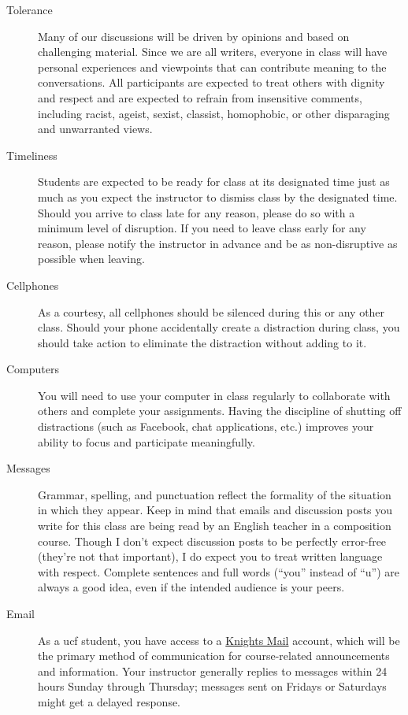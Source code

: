 \documentclass[11pt, twosides]{amsart}	%
\begin{document}
	\begin{description}
	\item[Tolerance] Many of our discussions will be driven by opinions and based on challenging material.  Since we are all writers, everyone in class will have personal experiences and viewpoints that can contribute meaning to the conversations.  All participants are expected to treat others with dignity and respect and are expected to refrain from insensitive comments, including racist, ageist, sexist, classist, homophobic, or other disparaging and unwarranted views.
	\item[Timeliness] Students are expected to be ready for class at its designated time just as much as you expect the instructor to dismiss class by the designated time.  Should you arrive to class late for any reason, please do so with a minimum level of disruption.  If you need to leave class early for any reason, please notify the instructor in advance and be as non-disruptive as possible when leaving.
	\item[Cellphones] As a courtesy, all cellphones should be silenced during this or any other class. Should your phone accidentally create a distraction during class, you should take action to eliminate the distraction without adding to it.
	\item[Computers] You will need to use your computer in class regularly to collaborate with others and complete your assignments. Having the discipline of shutting off distractions (such as Facebook, chat applications, etc.) improves your ability to focus and participate meaningfully.
	\item[Messages] Grammar, spelling, and punctuation reflect the formality of the situation in which they appear.  Keep in mind that emails and discussion posts you write for this class are being read by an English teacher in a composition course.  Though I don't expect discussion posts to be perfectly error-free (they're not that important), I do expect you to treat written language with respect. Complete sentences and full words (``you'' instead of ``u'') are always a good idea, even if the intended audience is your peers.
	\item[Email] As a \ac{ucf} student, you have access to a \href{http://www.outlook.com/knights.ucf.edu}{Knights Mail} account, which will be the primary method of communication for course-related announcements and information. Your instructor generally replies to messages within 24 hours Sunday through Thursday; messages sent on Fridays or Saturdays might get a delayed response.
	\end{description}
	
\end{document}
